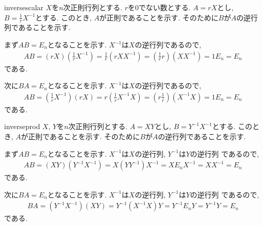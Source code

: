 \begin{proofof*}{inverse}{scalar}
  $X$を$n$次正則行列とする.
  $r$を$0$でない数とする.
  $A=rX$とし,
  $B=\frac{1}{r}X^{-1}$とする.
  このとき, $A$が正則であることを示す.
  そのために$B$が$A$の逆行列であることを示す.

  まず$AB=E_n$となることを示す.
  $X^{-1}$は$X$の逆行列であるので,
  \begin{align*}
    AB=(rX)(\frac{1}{r}X^{-1})=\frac{1}{r}(rXX^{-1})=(\frac{1}{r}r)(XX^{-1})=1E_n=E_n
  \end{align*}
  である.

  次に$BA=E_n$となることを示す.
  $X^{-1}$は$X$の逆行列であるので,
  \begin{align*}
    AB=(\frac{1}{r}X^{-1})(rX)=r(\frac{1}{r}X^{-1}X)=(r\frac{1}{r})(X^{-1}X)=1E_n=E_n
  \end{align*}
  である.
\end{proofof*}

\begin{proofof*}{inverse}{prod}
  $X$, $Y$を$n$次正則行列とする.
  $A=XY$とし,
  $B=Y^{-1}X^{-1}$とする.
  このとき, $A$が正則であることを示す.
  そのために$B$が$A$の逆行列であることを示す.

  まず$AB=E_n$となることを示す.
  $X^{-1}$は$X$の逆行列,
  $Y^{-1}$は$Y$の逆行列
  であるので,
  \begin{align*}
    AB=(XY)(Y^{-1}X^{-1})=X(YY^{-1})X^{-1}=XE_nX^{-1}=XX^{-1}=E_n
  \end{align*}
  である.

  次に$BA=E_n$となることを示す.
  $X^{-1}$は$X$の逆行列,
  $Y^{-1}$は$Y$の逆行列
  であるので,
  \begin{align*}
    BA=(Y^{-1}X^{-1})(XY)=Y^{-1}(X^{-1}X)Y=Y^{-1}E_nY=Y^{-1}Y=E_n
  \end{align*}
  である.
\end{proofof*}



